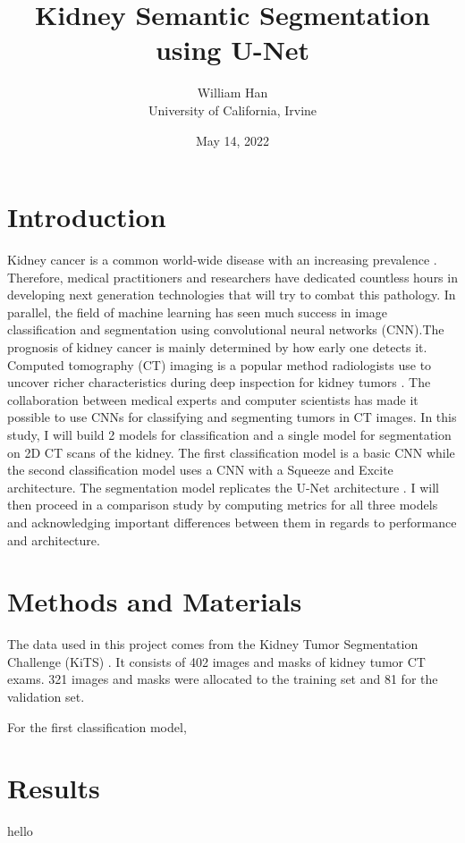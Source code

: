 \documentclass [12pt, letterpaper] {article}
\title{Kidney Semantic Segmentation using U-Net}
\author{William Han \\ University of California, Irvine}
\date{May 14, 2022}
\begin{document}
\maketitle

\section{Introduction}
Kidney cancer is a common world-wide disease with an increasing prevalence \cite{1}. Therefore, medical practitioners and researchers have dedicated countless hours in developing next generation technologies that will try to combat this pathology. In parallel, the field of machine learning has seen much success in image classification and segmentation using convolutional neural networks (CNN).The prognosis of kidney cancer is mainly determined by how early one detects it. Computed tomography (CT) imaging is a popular method radiologists use to uncover richer characteristics during deep inspection for kidney tumors \cite{1}. The collaboration between medical experts and computer scientists has made it possible to use CNNs for classifying and segmenting tumors in CT images. In this study, I will build 2 models for classification and a single model for segmentation on 2D CT scans of the kidney. The first classification model is a basic CNN while the second classification model uses a CNN with a Squeeze and Excite architecture. The segmentation model replicates the U-Net architecture \cite{2}. I will then proceed in a comparison study by computing metrics for all three models and acknowledging important differences between them in regards to performance and architecture. 


\section{Methods and Materials }
The data used in this project comes from the Kidney Tumor Segmentation Challenge (KiTS) \cite{1}. It consists of 402 images and masks of kidney tumor CT exams. 321 images and masks were allocated to the training set and 81 for the validation set. 

For the first classification model, 



\section{Results}
hello
\end{document}
